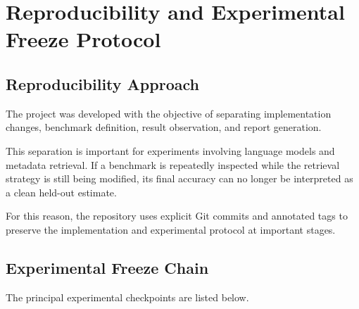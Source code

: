 \section{Reproducibility and Experimental Freeze Protocol}
\label{sec:reproducibility}

\subsection{Reproducibility Approach}

The project was developed with the objective of separating implementation
changes, benchmark definition, result observation, and report generation.

This separation is important for experiments involving language models and
metadata retrieval. If a benchmark is repeatedly inspected while the
retrieval strategy is still being modified, its final accuracy can no longer
be interpreted as a clean held-out estimate.

For this reason, the repository uses explicit Git commits and annotated tags
to preserve the implementation and experimental protocol at important stages.


\subsection{Experimental Freeze Chain}

The principal experimental checkpoints are listed below.

